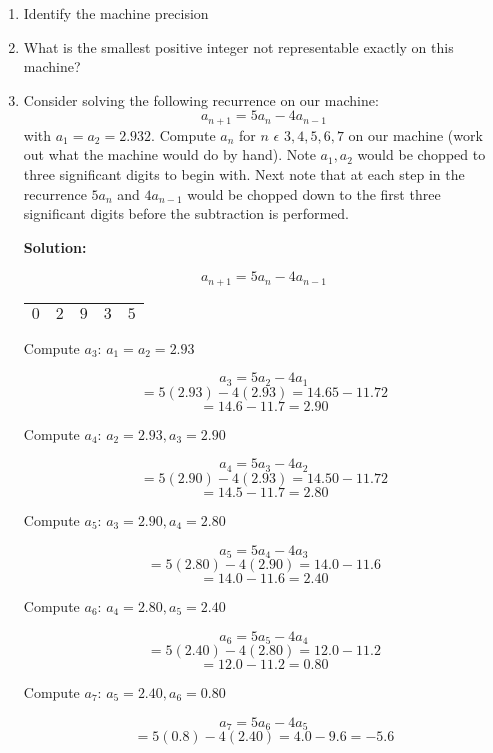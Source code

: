 \documentclass{article}
\begin{document}
\begin{enumerate}
\begin{enumerate}
\item Identify the machine precision
\item What is the smallest positive integer not representable exactly on this machine?
\item Consider solving the following recurrence on our machine:
    $$a_{n+1} = 5a_{n} - 4a_{n-1}$$
with $a_{1} = a_{2} = 2.932$. Compute $a_{n}$ for $n$ $\epsilon$ ${3,4,5,6,7}$ on our
machine (work out what the machine would do by hand). Note $a_{1}, a_{2}$ would be chopped 
to three significant digits to begin with. Next note that at each step in the recurrence
$5a_{n}$ and $4a_{n-1}$ would be chopped down to the first three significant digits before 
the subtraction is performed.

\textbf{Solution:}

    $$a_{n+1} = 5a_{n} - 4a_{n-1}$$

\begin{center}
\renewcommand{\arraystretch}{1.7}
\begin{tabular}{|c|c|c|c|c|}
\hline
$0$ & $2$ & $9$ & $3$ & $5$ \\
\hline
\end{tabular}
\end{center}

        Compute $a_{3}$: $a_{1} = a_{2} = 2.93$

        $$a_{3} = 5a_{2} - 4a_{1}$$
        $$= 5(2.93) - 4(2.93) = 14.65 - 11.72$$
        $$= 14.6 - 11.7 = 2.90$$

        Compute $a_{4}$: $a_{2} = 2.93, a_{3} = 2.90$

        $$a_{4} = 5a_{3} - 4a_{2}$$
        $$= 5(2.90) - 4(2.93) = 14.50 - 11.72$$
        $$= 14.5 - 11.7 = 2.80$$

        Compute $a_{5}$: $a_{3} = 2.90, a_{4} = 2.80$

        $$a_{5} = 5a_{4} - 4a_{3}$$
        $$= 5(2.80) - 4(2.90) = 14.0 - 11.6$$
        $$= 14.0 - 11.6 = 2.40$$

        Compute $a_{6}$: $a_{4} = 2.80, a_{5} = 2.40$

        $$a_{6} = 5a_{5} - 4a_{4}$$
        $$= 5(2.40) - 4(2.80) = 12.0 - 11.2$$
        $$= 12.0 - 11.2 = 0.80$$

        Compute $a_{7}$: $a_{5} = 2.40, a_{6} = 0.80$

        $$a_{7} = 5a_{6} - 4a_{5}$$
        $$= 5(0.8) - 4(2.40) = 4.0 - 9.6 = -5.6$$


\end{enumerate}


\end{enumerate}
\end{document}

